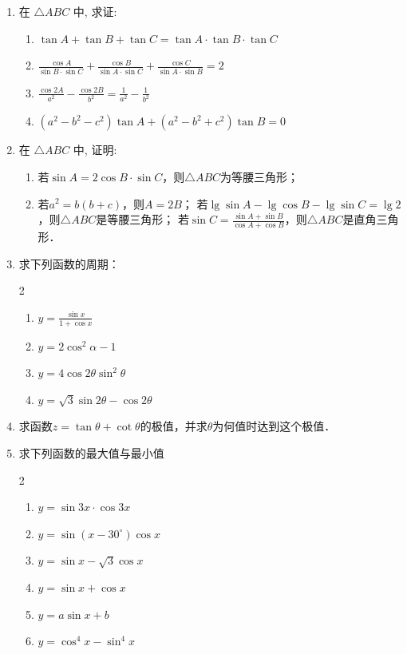 \begin{enumerate}
\item 在 $\triangle A B C$ 中, 求证:
\begin{enumerate}
    \item $\tan  A+\tan  B+\tan  C=\tan  A \cdot \tan  B \cdot \tan  C$
    \item $\frac{\cos A}{\sin B \cdot \sin C}+\frac{\cos B}{\sin A \cdot \sin C}+\frac{\cos C}{\sin A \cdot \sin B}=2$
    \item $\frac{\cos 2 A}{a^{2}}-\frac{\cos 2 B}{b^{2}}=\frac{1}{a^{2}}-\frac{1}{b^{2}}$
    \item $\left(a^{2}-b^{2}-c^{2}\right) \tan  A+\left(a^{2}-b^{2}+c^{2}\right) \tan  B=0$
\end{enumerate}


\item 在 $\triangle A B C$ 中, 证明:
\begin{enumerate}
    \item 若$\sin A=2\cos B\cdot \sin C$，则$\triangle A B C$为等腰三角形；
    \item 若$a^2=b(b+c)$，则$A=2B$；
    \staritem 若$\lg\sin A-\lg\cos B-\lg\sin C=\lg2$，则$\triangle A B C$是等腰三角形；
    \staritem 若$\sin C=\frac{\sin A+\sin B}{\cos A+\cos B}$，则$\triangle A B C$是直角三角形．
\end{enumerate}
\item 求下列函数的周期：
\begin{multicols}{2}
\begin{enumerate}
    \item $y=\frac{\sin x}{1+\cos x}$
    \item $y=2 \cos ^{2} \alpha-1$
    \item $y=4 \cos 2 \theta \sin ^{2} \theta$
    \item $y=\sqrt{3} \sin 2 \theta-\cos 2 \theta$
\end{enumerate}    
\end{multicols}

\item 求函数$z=\tan\theta+\cot\theta$的极值，并求$\theta$为何值时达到这个极值．
\item 求下列函数的最大值与最小值
\begin{multicols}{2}
\begin{enumerate}
    \item $y=\sin 3 x \cdot \cos 3 x$
    \item $y=\sin \left(x-30^{\circ}\right) \cos x$
    \item $y=\sin x-\sqrt{3} \cos x$
\item $y=\sin x+\cos x$
\item $y=a \sin x+b$
\item $y=\cos ^{4} x-\sin ^{4} x$
\end{enumerate}    
\end{multicols}



\end{enumerate}
